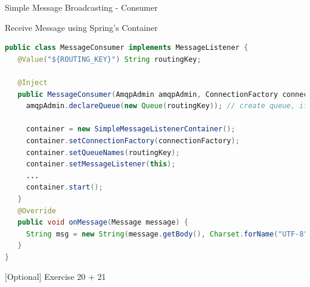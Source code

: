\begin{frame}[fragile]{Simple Message Broadcasting - Consumer}
\small
\begin{block}{Receive Message using Spring's  Container}
\begin{lstlisting}[language=Java,belowskip=-3mm,aboveskip=0mm]
public class MessageConsumer implements MessageListener {
   @Value("${ROUTING_KEY}") String routingKey;
   
   @Inject
   public MessageConsumer(AmqpAdmin amqpAdmin, ConnectionFactory connectionFactory) {
     amqpAdmin.declareQueue(new Queue(routingKey)); // create queue, if not there
     
     container = new SimpleMessageListenerContainer();
     container.setConnectionFactory(connectionFactory);
     container.setQueueNames(routingKey);
     container.setMessageListener(this);
     ...
     container.start();
   }
   @Override
   public void onMessage(Message message) {
     String msg = new String(message.getBody(), Charset.forName("UTF-8"));
   }
}
\end{lstlisting}
\end{block}
\end{frame}

\begin{frame}{[Optional] Exercise 20 + 21}
	\begin{figure}
	\end{figure}
\end{frame}

